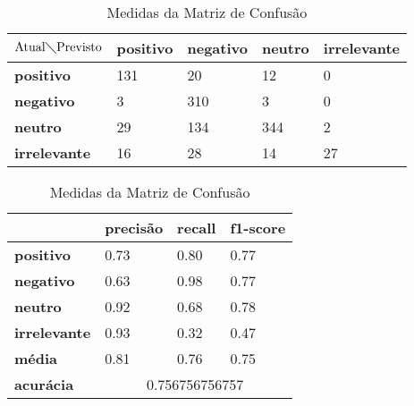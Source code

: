\begin{table}[h!]
\centering
\begin{minipage}[b]{0.45\linewidth}
\caption{Matriz de Confusão Quaternário: \textit{Naive Bayes}}
\label{tab:mcb-nb}
\begin{tabular}{|l|l|l|l|l|}
\hline
$\textrm{Atual}\diagdown\textrm{Previsto}$ & \textbf{positivo} & \textbf{negativo} & \textbf{neutro} & \textbf{irrelevante}\\ \hline
\textbf{positivo} & 131 & 20 & 12 & 0\\ \hline
\textbf{negativo} & 3 & 310 & 3 & 0\\ \hline
\textbf{neutro} & 29 & 134 & 344 & 2\\ \hline
\textbf{irrelevante} & 16 & 28 & 14 & 27\\ \hline
\end{tabular}
\end{minipage}
\hspace{0.5cm}
\begin{minipage}[b]{0.45\linewidth}

\centering
\caption{Medidas da Matriz de Confusão}
\label{tab:mmcb-nb}
\begin{tabular}{|l|l|l|l|}
\hline
         & \textbf{precisão} & \textbf{recall} & \textbf{f1-score} \\ \hline
\textbf{positivo} & 0.73     & 0.80   & 0.77     \\ \hline
\textbf{negativo} & 0.63     & 0.98   & 0.77     \\ \hline
\textbf{neutro} & 0.92     & 0.68   & 0.78     \\ \hline
\textbf{irrelevante} & 0.93     & 0.32   & 0.47     \\ \hline
\textbf{média} & 0.81     & 0.76   & 0.75     \\ \hline
\textbf{acurácia} & \multicolumn{3}{|c|}{0.756756756757}\\ \hline
\end{tabular}
\end{minipage}
\end{table}